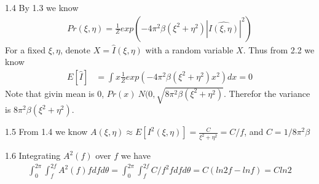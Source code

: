 \documentclass[12pt]{article}
\newenvironment{problem}[2][Problem]{\begin{trivlist}
\item[\hskip \labelsep {\bfseries #1}\hskip \labelsep {\bfseries #2}]}{\end{trivlist}}
\begin{document}
\begin{problem}{1.}
\item{1.4}
By 1.3 we know
\begin{align*}
	Pr(\xi, \eta) = \frac{1}{Z}exp(-4\pi^2\beta(\xi^2+\eta^2)|\hat{I(\xi, \eta)}|^2)
\end{align*}
For a fixed $\xi, \eta$, denote $X = \hat{I}(\xi, \eta)$ with a random variable $X$. Thus from 2.2 we know
\begin{align*}
	E[\hat{I}] &= \int x \frac{1}{Z}exp(-4\pi^2\beta(\xi^2+\eta^2)x^2) dx = 0
\end{align*}
Note that givin mean is 0, $Pr(x) ~ N(0, \sqrt{8\pi^2\beta(\xi^2+\eta^2)}$. Therefor the variance is 
$8\pi^2\beta(\xi^2+\eta^2)$.\\

\item{1.5} From 1.4 we know $A(\xi, \eta) \approx E[I^2(\xi, \eta)] = \frac{C}{\xi^2+\eta^2} = C/f$, and $C = 1/8\pi^2\beta$

\item{1.6} Integrating $A^2(f)$ over $f$ we have
\begin{align*}
	\int_0^{2\pi}\int_{f}^{2f}A^2(f)fdfd\theta = \int_0^{2\pi}\int_{f}^{2f}C/f^2 f dfd\theta = C(ln2f - lnf) = Cln2
\end{align*}

\end{problem}
\end{document}
